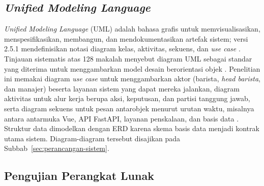 \subsection{\texorpdfstring{\textit{Unified Modeling Language}}{Unified Modeling Language}}
\label{subsec:uml}

\textit{Unified Modeling Language} (UML) adalah bahasa grafis untuk memvisualisasikan, menspesifikasikan, membangun, dan mendokumentasikan artefak sistem; versi 2.5.1 mendefinisikan notasi diagram kelas, aktivitas, sekuens, dan \textit{use case} \citep*{omg2017unified}. Tinjauan sistematis atas 128 makalah menyebut diagram UML sebagai standar yang diterima untuk menggambarkan model desain berorientasi objek \citep*{koc2021uml}. Penelitian ini memakai diagram \textit{use case} untuk menggambarkan aktor (barista, \textit{head barista}, dan manajer) beserta layanan sistem yang dapat mereka jalankan, diagram aktivitas untuk alur kerja berupa aksi, keputusan, dan partisi tanggung jawab, serta diagram sekuens untuk pesan antarobjek menurut urutan waktu, misalnya antara antarmuka Vue, API FastAPI, layanan penskalaan, dan basis data \citep*{omg2017unified}. Struktur data dimodelkan dengan ERD karena skema basis data menjadi kontrak utama sistem. Diagram-diagram tersebut disajikan pada Subbab~\ref{sec:perancangan-sistem}.

\subsection{Pengujian Perangkat Lunak}
\label{subsec:pengujian}

